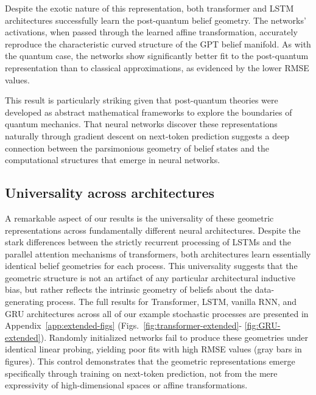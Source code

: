 \documentclass[prx,nofootinbib,onecolumn,showkeys,groupaddress,preprintnumbers,floatfix,
superscriptaddress]{revtex4-1}
\begin{document}
Despite the exotic nature of this representation, both transformer and LSTM architectures successfully learn the post-quantum belief geometry. The networks' activations, when passed through the learned affine transformation, accurately reproduce the characteristic curved structure of the GPT belief manifold. As with the quantum case, the networks show significantly better fit to the post-quantum representation than to classical approximations, as evidenced by the lower RMSE values.

This result is particularly striking given that post-quantum theories were developed as abstract mathematical frameworks to explore the boundaries of quantum mechanics. That neural networks discover these representations naturally through gradient descent on next-token prediction suggests a deep connection between the parsimonious geometry of belief states and the computational structures that emerge in neural networks.


\subsection{Universality across architectures}

A remarkable aspect of our results is the universality of these geometric representations across fundamentally different neural architectures. Despite the stark differences between the strictly recurrent processing of LSTMs and the parallel attention mechanisms of transformers, both architectures learn essentially identical belief geometries for each process. This universality suggests that the geometric structure is not an artifact of any particular architectural inductive bias, but rather reflects the intrinsic geometry of beliefs about the data-generating process. The full results for Transformer, LSTM, vanilla RNN, and GRU architectures across all 
of our example
stochastic processes are presented in Appendix~\ref{app:extended-figs} (Figs.~\ref{fig:transformer-extended}-%
\ref{fig:GRU-extended}).
Randomly initialized networks fail to produce these geometries under identical linear probing, yielding poor fits with high RMSE values (gray bars in figures). This control demonstrates that the geometric representations emerge specifically through training on next-token prediction, not from the mere expressivity of high-dimensional spaces or affine transformations.
\end{document}
